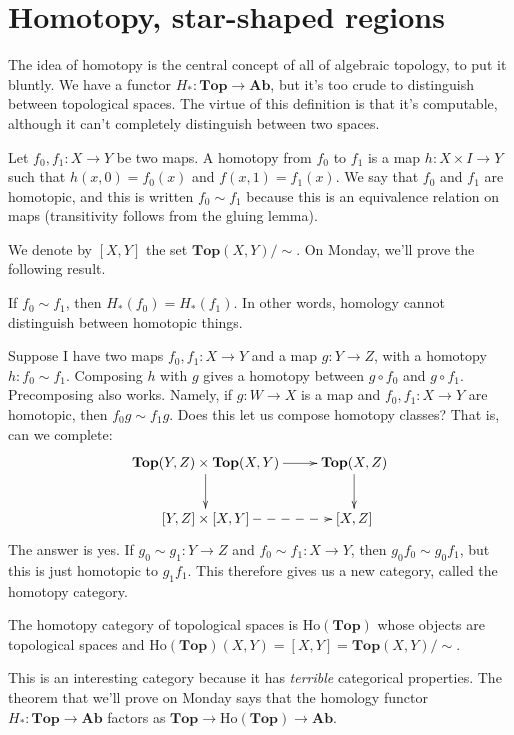 \section{Homotopy, star-shaped regions}
The idea of homotopy is the central concept of all of algebraic topology, to put it bluntly. We have a functor $ H_\ast:\mathbf{Top}\to\mathbf{Ab}$, but it's too crude to distinguish between topological spaces. The virtue of this definition is that it's computable, although it can't completely distinguish between two spaces.
\begin{definition}
Let $f_0,f_1:X\to Y$ be two maps. A homotopy from $f_0$ to $f_1$ is a map $h:X\times I\to Y$ such that $h(x,0)=f_0(x)$ and $f(x,1)=f_1(x)$. We say that $f_0$ and $f_1$ are homotopic, and this is written $f_0\sim f_1$ because this is an equivalence relation on maps (transitivity follows from the gluing lemma).
\end{definition}
We denote by $[X,Y]$ the set $\mathbf{Top}(X,Y)/\sim$. On Monday, we'll prove the following result.
\begin{theorem}
If $f_0\sim f_1$, then $ H_\ast(f_0)= H_\ast(f_1)$. In other words, homology cannot distinguish between homotopic things.
\end{theorem}
Suppose I have two maps $f_0,f_1:X\to Y$ and a map $g:Y\to Z$, with a homotopy $h:f_0\sim f_1$. Composing $h$ with $g$ gives a homotopy between $g\circ f_0$ and $g\circ f_1$. Precomposing also works. Namely, if $g:W\to X$ is a map and $f_0,f_1:X\to Y$ are homotopic, then $f_0g\sim f_1g$. Does this let us compose homotopy classes? That is, can we complete:
\begin{equation*}
\xymatrix{\mathbf{Top}(Y,Z)\times\mathbf{Top}(X,Y)\ar[d]\ar[r] & \mathbf{Top}(X,Z)\ar[d]\\
[Y,Z]\times[X,Y]\ar@{-->}[r] & [X,Z]}
\end{equation*}
The answer is yes. If $g_0\sim g_1:Y\to Z$ and $f_0\sim f_1: X\to Y$, then $g_0f_0\sim g_0f_1$, but this is just homotopic to $g_1f_1$. This therefore gives us a new category, called the homotopy category.
\begin{definition}
The homotopy category of topological spaces is $\mathrm{Ho}(\mathbf{Top})$ whose objects are topological spaces and $\mathrm{Ho}(\mathbf{Top})(X,Y)=[X,Y]=\mathbf{Top}(X,Y)/\sim$.
\end{definition}
This is an interesting category because it has \textit{terrible} categorical properties. The theorem that we'll prove on Monday says that the homology functor $ H_\ast:\mathbf{Top}\to\mathbf{Ab}$ factors as $\mathbf{Top}\to\mathrm{Ho}(\mathbf{Top})\to\mathbf{Ab}$.
